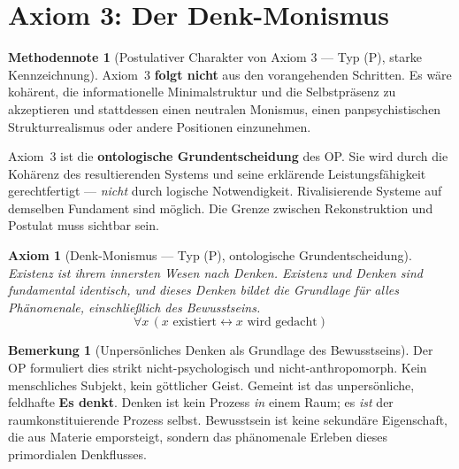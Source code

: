 \documentclass[11pt,a4paper]{article}
\theoremstyle{plain}
\newtheorem{axiom}{Axiom}[section]
\theoremstyle{definition}
\newtheorem{remark}{Bemerkung}[section]
\newtheorem{methodennote}{Methodennote}[section]
\begin{document}
\section{Axiom 3: Der Denk-Monismus}

\begin{methodennote}[Postulativer Charakter von Axiom 3 --- Typ (P), starke Kennzeichnung]
Axiom~3 \textbf{folgt nicht} aus den vorangehenden Schritten. Es w\"{a}re koh\"{a}rent,
die informationelle Minimalstruktur und die Selbstpr\"{a}senz zu akzeptieren und
stattdessen einen neutralen Monismus, einen panpsychistischen Strukturrealismus oder
andere Positionen einzunehmen.

Axiom~3 ist die \textbf{ontologische Grundentscheidung} des OP. Sie wird durch die
Koh\"{a}renz des resultierenden Systems und seine erkl\"{a}rende Leistungsf\"{a}higkeit
gerechtfertigt --- \emph{nicht} durch logische Notwendigkeit. Rivalisierende Systeme auf
demselben Fundament sind m\"{o}glich. Die Grenze zwischen Rekonstruktion und Postulat
muss sichtbar sein.
\end{methodennote}

\begin{axiom}[Denk-Monismus \textnormal{--- Typ (P), ontologische Grundentscheidung}]
Existenz ist ihrem innersten Wesen nach Denken. Existenz und Denken sind fundamental
identisch, und dieses Denken bildet die Grundlage f\"{u}r alles Ph\"{a}nomenale,
einschlie\ss{}lich des Bewusstseins.
\[
  \forall x\,(x\text{ existiert}\leftrightarrow x\text{ wird gedacht})
\]
\end{axiom}

\begin{remark}[Unpers\"{o}nliches Denken als Grundlage des Bewusstseins]
Der OP formuliert dies strikt nicht-psychologisch und nicht-anthropomorph. Kein
menschliches Subjekt, kein g\"{o}ttlicher Geist. Gemeint ist das unpers\"{o}nliche,
feldhafte \textbf{\glqq{}Es denkt\grqq{}}. Denken ist kein Prozess \emph{in} einem Raum;
es \emph{ist} der raumkonstituierende Prozess selbst. Bewusstsein ist keine sekund\"{a}re
Eigenschaft, die aus Materie emporsteigt, sondern das ph\"{a}nomenale Erleben dieses
primordialen Denkflusses.
\end{remark}
\end{document}
